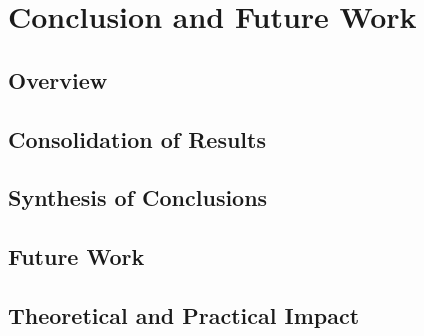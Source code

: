 \chapter{Conclusion and Future Work}\label{sec:Conclusion}
    \section{Overview}
    \section{Consolidation of Results}
    \section{Synthesis of Conclusions}
    \section{Future Work}
    \section{Theoretical and Practical Impact}